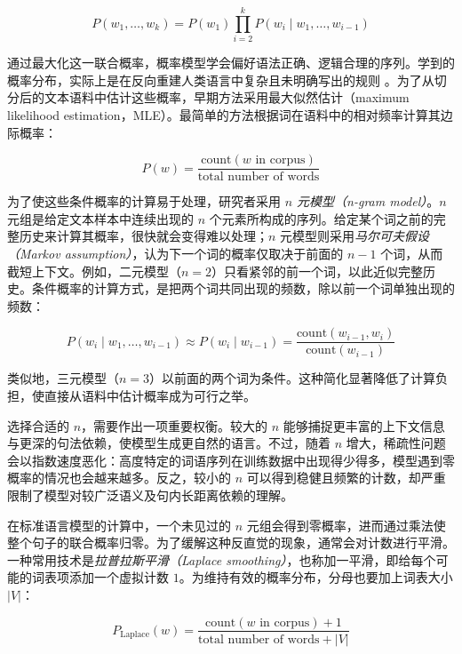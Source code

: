 \begin{equation}
\label{eq:bigram}
    P(w_1, \dots, w_k) = P(w_1) \prod_{i=2}^{k} P(w_i \mid w_1, \dots, w_{i-1})
\end{equation}

通过最大化这一联合概率，概率模型学会偏好语法正确、逻辑合理的序列。学到的概率分布，实际上是在反向重建人类语言中复杂且未明确写出的规则 \citep{manning1999foundations}。为了从切分后的文本语料中估计这些概率，早期方法采用最大似然估计（maximum likelihood estimation，MLE）。最简单的方法根据词在语料中的相对频率计算其边际概率：

\begin{equation}
\label{eq:mle-word-prob}
    P(w) = \frac{\text{count}(w \text{ in corpus})}{\text{total number of words}}
\end{equation}

为了使这些条件概率的计算易于处理，研究者采用 \emph{$n$ 元模型（n-gram model）}。$n$ 元组是给定文本样本中连续出现的 $n$ 个元素所构成的序列。给定某个词之前的完整历史来计算其概率，很快就会变得难以处理；$n$ 元模型则采用\emph{马尔可夫假设（Markov assumption）}，认为下一个词的概率仅取决于前面的 $n-1$ 个词，从而截短上下文。例如，二元模型（$n=2$）只看紧邻的前一个词，以此近似完整历史。条件概率的计算方式，是把两个词共同出现的频数，除以前一个词单独出现的频数：

\begin{equation}
    P(w_i \mid w_1, \dots, w_{i-1}) \approx P(w_i \mid w_{i-1}) = \frac{\text{count}(w_{i-1}, w_i)}{\text{count}(w_{i-1})}
\end{equation}

类似地，三元模型（$n=3$）以前面的两个词为条件。这种简化显著降低了计算负担，使直接从语料中估计概率成为可行之举。

选择合适的 $n$，需要作出一项重要权衡。较大的 $n$ 能够捕捉更丰富的上下文信息与更深的句法依赖，使模型生成更自然的语言。不过，随着 $n$ 增大，稀疏性问题会以指数速度恶化：高度特定的词语序列在训练数据中出现得少得多，模型遇到零概率的情况也会越来越多。反之，较小的 $n$ 可以得到稳健且频繁的计数，却严重限制了模型对较广泛语义及句内长距离依赖的理解。

在标准语言模型的计算中，一个未见过的 $n$ 元组会得到零概率，进而通过乘法使整个句子的联合概率归零。为了缓解这种反直觉的现象，通常会对计数进行平滑。一种常用技术是\emph{拉普拉斯平滑（Laplace smoothing）}，也称加一平滑，即给每个可能的词表项添加一个虚拟计数 $1$。为维持有效的概率分布，分母也要加上词表大小 $|V|$：

\begin{equation}
\label{eq:mle-word-prob-laplace}
    P_{\text{Laplace}}(w) = \frac{\text{count}(w \text{ in corpus}) + 1}{\text{total number of words} + |V|}
\end{equation}

